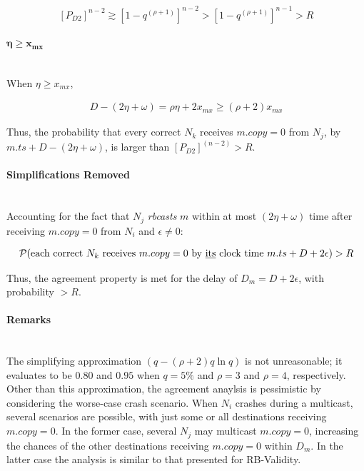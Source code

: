     \begin{equation}
        \begin{aligned}
                \left[P_{D2} \right]^{n-2} \gtrsim \left[ 1 - q^{(\rho+1)} \right] ^{n-2} > \left[ 1 - q ^{(\rho + 1)}\right]^{n-1} > R
        \end{aligned}
    \end{equation}
    
    
    \paragraph{$\bm{\eta \geq x_{mx}}$} \hfill \\
    When $\eta \geq x_{mx}$,
    
    \begin{equation}
        \begin{aligned}
                D - \left( 2 \eta + \omega \right) = \rho \eta + 2 x_{mx} \geq (\rho + 2) x_{mx}
            \end{aligned}
        \end{equation}
        
    Thus, the probability that every correct $N_k$ receives $m.copy = 0$ from $N_j$, by ${m.ts + D - (2\eta + \omega)}$, is larger than ${\left[P_{D2}\right]^{(n - 2)} > R}$.  

    \paragraph{Simplifications Removed} \hfill \\    
    Accounting for the fact that $N_j$ \emph{rbcasts} $m$ within at most $(2 \eta + \omega)$ time after receiving $m.copy = 0$ from $N_i$ and $\epsilon \neq 0$:
    
    \begin{equation}
        \begin{aligned}
                \mathcal{P}(\text{each correct } N_k \text{ receives } m.copy = 0 \text{ by \underline{its} clock time } m.ts + D + 2\epsilon) > R
         \end{aligned}
    \end{equation}
    
    Thus, the agreement property is met for the delay of $D_m = D + 2\epsilon$, with probability $> R$.  
    
    \paragraph{Remarks} \hfill \\
    The simplifying approximation $(q - (\rho + 2) q \ln q)$ is not unreasonable; it evaluates to be $0.80$ and $0.95$ when $q = 5\%$ and $\rho = 3$ and $\rho = 4$, respectively.  Other than this approximation, the agreement anaylsis is pessimistic by considering the worse-case crash scenario.  When $N_i$ crashes during a multicast, several scenarios are possible, with just some or all destinations receiving $m.copy = 0$.  In the former case, several $N_j$ may multicast $m.copy = 0$, increasing the chances of the other destinations receiving $m.copy = 0$ within $D_m$.  In the latter case the analysis is similar to that presented for RB-Validity.  
    
